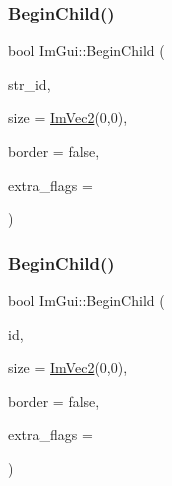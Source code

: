 \subsubsection{\texorpdfstring{Begin\+Child()}{BeginChild()}\hspace{0.1cm}{\footnotesize\ttfamily [1/2]}}
{\footnotesize\ttfamily bool Im\+Gui\+::\+Begin\+Child (\begin{DoxyParamCaption}\item[{const char $\ast$}]{str\+\_\+id,  }\item[{const \mbox{\hyperlink{struct_im_vec2}{Im\+Vec2}} \&}]{size = {\ttfamily \mbox{\hyperlink{struct_im_vec2}{Im\+Vec2}}(0,0)},  }\item[{bool}]{border = {\ttfamily false},  }\item[{\mbox{\hyperlink{imgui_8h_a0b8e067ab4f7a818828c8d89e531addc}{Im\+Gui\+Window\+Flags}}}]{extra\+\_\+flags = {} }\end{DoxyParamCaption})}

\mbox{\label{namespace_im_gui_a3320a3f36d9d8b227f93a015792379d3}} 
\subsubsection{\texorpdfstring{Begin\+Child()}{BeginChild()}\hspace{0.1cm}{\footnotesize\ttfamily [2/2]}}
{\footnotesize\ttfamily bool Im\+Gui\+::\+Begin\+Child (\begin{DoxyParamCaption}\item[{\mbox{\hyperlink{imgui_8h_a1785c9b6f4e16406764a85f32582236f}{Im\+Gui\+ID}}}]{id,  }\item[{const \mbox{\hyperlink{struct_im_vec2}{Im\+Vec2}} \&}]{size = {\ttfamily \mbox{\hyperlink{struct_im_vec2}{Im\+Vec2}}(0,0)},  }\item[{bool}]{border = {\ttfamily false},  }\item[{\mbox{\hyperlink{imgui_8h_a0b8e067ab4f7a818828c8d89e531addc}{Im\+Gui\+Window\+Flags}}}]{extra\+\_\+flags = {} }\end{DoxyParamCaption})}

\mbox{\label{namespace_im_gui_a26d6981a769d3fbe9be9a25975b5dc6b}} 
